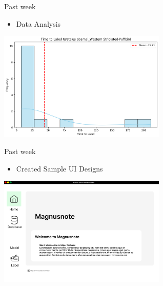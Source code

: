 \begin{frame}{Past week}
    \begin{itemize}
        \item Data Analysis
    \end{itemize}
    \centering
    \includegraphics[width=0.6\textwidth]{images/data analysis.png}
\end{frame}

\begin{frame}{Past week}
    \begin{itemize}
        \item Created Sample UI Designs
    \end{itemize}
    \centering
    \includegraphics[width=0.6\textwidth]{images/sampleui1.png}
\end{frame}

